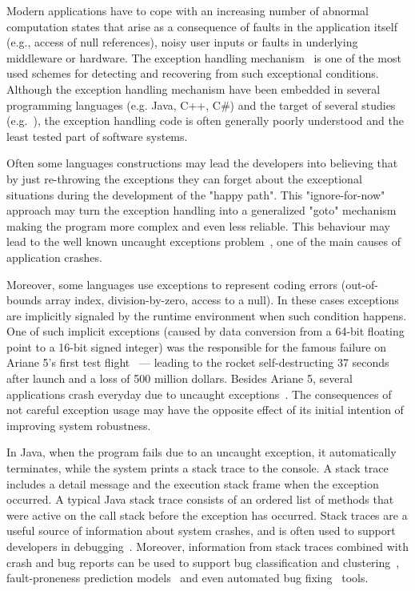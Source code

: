 \documentclass[conference]{IEEEtran}
\begin{document}
Modern applications have to cope with an increasing number of abnormal computation states that arise as a consequence of faults in the application itself (e.g., access of null references), noisy user inputs or faults in underlying middleware or hardware. The exception handling mechanism~\cite{goodenough1975exception} is one of the most used schemes for detecting and recovering from such exceptional conditions. Although the exception handling mechanism have been embedded in several programming languages (e.g. Java, C++, C\#) and the target of several studies (e.g.~\cite{miller1997issues,robillard2000designing,shah2010understanding,garcia2007extracting,garcia2001comparative,cabral2007exception,coelho2011unveiling}), the exception handling code is often generally poorly understood and the least tested part of software systems. 

Often some languages constructions may lead the developers into believing that by just re-throwing the exceptions they can forget about the exceptional situations during the development of the "happy path". This "ignore-for-now" approach may turn the exception handling into a generalized "goto" mechanism~\cite{mandrioli1992advances} making the program more complex and even less reliable. This behaviour may lead to the well known uncaught exceptions problem~\cite{jo2004uncaught}, one of the main causes of application crashes.  

Moreover, some languages use exceptions to represent coding errors (out-of-bounds array index, division-by-zero, access to a null). In these cases exceptions are implicitly signaled by the runtime environment when such condition happens. One of such implicit exceptions (caused by data conversion from a 64-bit floating point to a 16-bit signed integer) was the responsible for the famous failure on Ariane 5's first test flight~\cite{lions1996ariane} --- leading to the rocket self-destructing 37 seconds after launch and a loss of 500 million dollars. Besides Ariane 5, several applications crash everyday due to uncaught exceptions~\cite{jo2004uncaught}. The consequences of not careful exception usage may have the opposite effect of its initial intention of improving system robustness.

In Java, when the program fails due to an uncaught exception, it automatically terminates, while the system prints a
stack trace to the console. A stack trace includes a detail message and the execution stack frame when the exception occurred. A typical Java stack trace consists of an ordered list of methods that were active on the call stack before the exception has occurred. Stack traces are a useful source of information about system crashes, and is often used to support developers in debugging~\cite{schroter2010stack}. Moreover, information from stack traces combined with crash and bug reports can be used to support bug classification and clustering~\cite{wang2013improving, kim2011crash, dhaliwal2011classifying}, fault-proneness prediction models~\cite{kim2013predicting} and even automated bug fixing~\cite{sinha2009fault} tools. 
\end{document}
